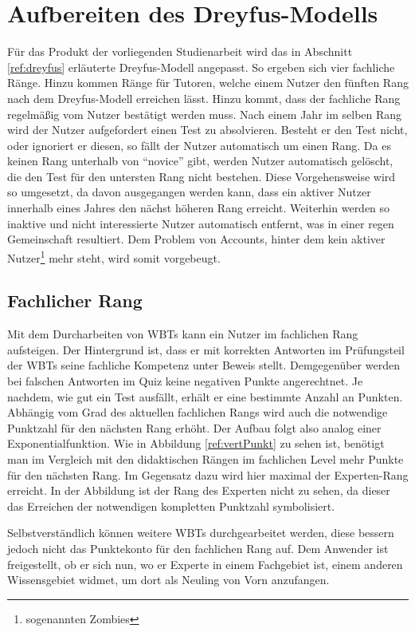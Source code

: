 \section{Aufbereiten des Dreyfus-Modells}\label{ref:dreyfusConcept} 
Für das Produkt der vorliegenden Studienarbeit wird das in Abschnitt
\ref{ref:dreyfus} erläuterte Dreyfus-Modell angepasst. So ergeben sich vier
fachliche Ränge. Hinzu kommen Ränge für Tutoren, welche einem Nutzer den fünften
Rang nach dem Dreyfus-Modell erreichen lässt. Hinzu kommt, dass der fachliche
Rang regelmäßig vom Nutzer bestätigt werden muss. Nach einem Jahr im selben Rang
wird der Nutzer aufgefordert einen Test zu absolvieren.
Besteht er den Test nicht, oder ignoriert er diesen, so fällt der Nutzer
automatisch um einen Rang. Da es keinen Rang unterhalb von "`novice"' gibt,
werden Nutzer automatisch gelöscht, die den Test für den untersten Rang nicht
bestehen. Diese Vorgehensweise wird so umgesetzt, da davon ausgegangen werden
kann, dass ein aktiver Nutzer innerhalb eines Jahres den nächst höheren Rang
erreicht. Weiterhin werden so inaktive und nicht interessierte Nutzer
automatisch entfernt, was in einer regen Gemeinschaft resultiert. Dem Problem
von Accounts, hinter dem kein aktiver Nutzer\footnote{sogenannten Zombies} mehr
steht, wird somit vorgebeugt.

\subsection{Fachlicher Rang}\label{ref:rankTopic}
Mit dem Durcharbeiten von WBTs kann ein Nutzer im fachlichen Rang aufsteigen.
Der Hintergrund ist, dass er mit korrekten Antworten im Prüfungsteil der WBTs
seine fachliche Kompetenz unter Beweis stellt. Demgegenüber werden bei falschen
Antworten im Quiz keine negativen Punkte angerechtnet. Je nachdem, wie gut ein
Test ausfällt, erhält er eine bestimmte Anzahl an Punkten. Abhängig vom Grad des
aktuellen fachlichen Rangs wird auch die notwendige Punktzahl für den nächsten
Rang erhöht. Der Aufbau folgt also analog einer Exponentialfunktion. Wie in
Abbildung \ref{ref:vertPunkt} zu sehen ist, benötigt man im Vergleich mit den
didaktischen Rängen im fachlichen Level mehr Punkte für den nächsten Rang. Im
Gegensatz dazu wird hier maximal der Experten-Rang erreicht. In der Abbildung
ist der Rang des Experten nicht zu sehen, da dieser das Erreichen der
notwendigen kompletten Punktzahl symbolisiert.

Selbstverständlich können weitere WBTs durchgearbeitet werden, diese bessern
jedoch nicht das Punktekonto für den fachlichen Rang auf. Dem Anwender ist
freigestellt, ob er sich nun, wo er Experte in einem Fachgebiet ist, einem
anderen Wissensgebiet widmet, um dort als Neuling von Vorn anzufangen.

